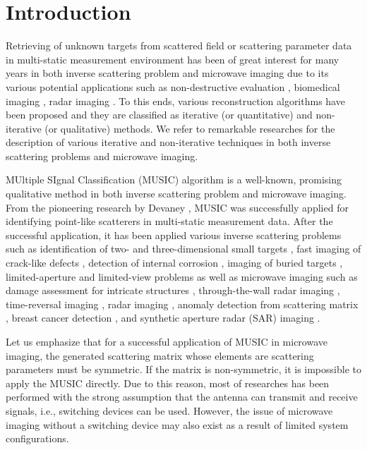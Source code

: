 \documentclass[3p,10pt]{elsarticle}
\theoremstyle{plain}
\theoremstyle{remark}
\begin{document}




\section{Introduction}\label{sec:1}
Retrieving of unknown targets from scattered field or scattering parameter data in multi-static measurement environment has been of great interest for many years in both inverse scattering problem and microwave imaging due to its various potential applications such as non-destructive evaluation \cite{CMPD,FMGD,TLRD}, biomedical imaging \cite{A2,CJGT,ML2}, radar imaging \cite{JBRBTFC,LSL,SSA}. To this ends, various reconstruction algorithms have been proposed and they are classified as iterative (or quantitative) and non-iterative (or qualitative) methods. We refer to remarkable researches \cite{AGJKLSW,BCS,C7,CK,DL,SH,Z2} for the description of various iterative and non-iterative techniques in both inverse scattering problems and microwave imaging.

MUltiple SIgnal Classification (MUSIC) algorithm is a well-known,  promising qualitative method in both inverse scattering problem and microwave imaging. From the pioneering research by Devaney \cite{D}, MUSIC was successfully applied for identifying point-like scatterers in multi-static measurement data. After the successful application, it has been applied various inverse scattering problems such as identification of two- and three-dimensional small targets \cite{AILP,ZC}, fast imaging of crack-like defects \cite{P-MUSIC1,P-MUSIC8}, detection of internal corrosion \cite{AKKLV}, imaging of buried targets \cite{AIL1,G2}, limited-aperture and limited-view problems \cite{AJP,P-MUSIC7} as well as microwave imaging such as damage assessment for intricate structures \cite{BYG}, through-the-wall radar imaging \cite{CPPPDT}, time-reversal imaging \cite{MGS}, radar imaging \cite{OBP}, anomaly detection from scattering matrix \cite{P-MUSIC6}, breast cancer detection \cite{RSCGBA}, and synthetic aperture radar (SAR) imaging \cite{ZZK}.

Let us emphasize that for a successful application of MUSIC in microwave imaging, the generated scattering matrix whose elements are scattering parameters must be symmetric. If the matrix is non-symmetric, it is impossible to apply the MUSIC directly. Due to this reason, most of researches has been performed with the strong assumption that the antenna can transmit and receive signals, i.e., switching devices can be used. However, the issue of microwave imaging without a switching device may also exist as a result of limited system configurations.
\end{document}
